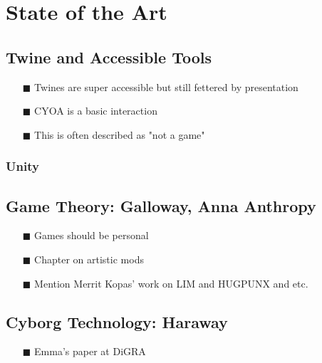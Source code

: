 
\chapter{State of the Art} %

\label{Chapter3} %




\section{Twine and Accessible Tools}
\begin{itemize}
\item[\tiny{$\blacksquare$}] Twines are super accessible but still fettered by presentation
\item[\tiny{$\blacksquare$}] CYOA is a basic interaction
\item[\tiny{$\blacksquare$}] This is often described as "not a game"
\end{itemize}
\subsection{Unity}



\section{Game Theory: Galloway, Anna Anthropy}
\begin{itemize}
\item[\tiny{$\blacksquare$}] Games should be personal
\item[\tiny{$\blacksquare$}] Chapter on artistic mods
\item[\tiny{$\blacksquare$}] Mention Merrit Kopas' work on LIM and HUGPUNX and etc.
\end{itemize}

\section{Cyborg Technology: Haraway}
\begin{itemize}
\item[\tiny{$\blacksquare$}] Emma's paper at DiGRA
\end{itemize}